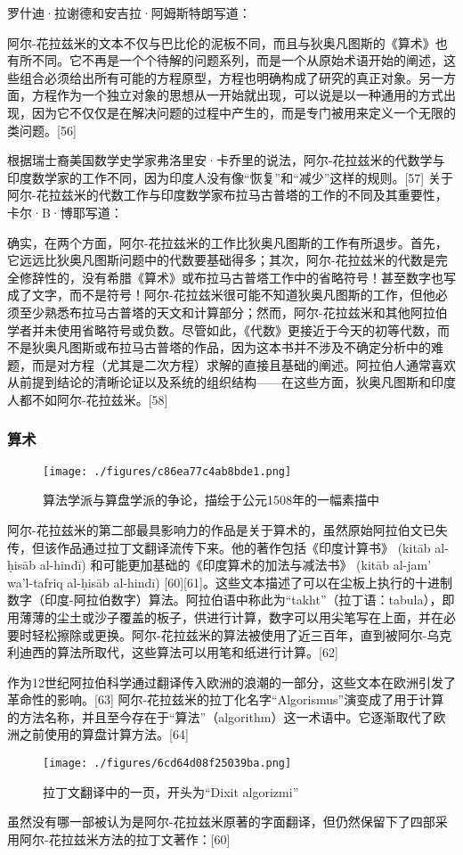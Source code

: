 罗什迪·拉谢德和安吉拉·阿姆斯特朗写道：

阿尔-花拉兹米的文本不仅与巴比伦的泥板不同，而且与狄奥凡图斯的《算术》也有所不同。它不再是一个个待解的问题系列，而是一个从原始术语开始的阐述，这些组合必须给出所有可能的方程原型，方程也明确构成了研究的真正对象。另一方面，方程作为一个独立对象的思想从一开始就出现，可以说是以一种通用的方式出现，因为它不仅仅是在解决问题的过程中产生的，而是专门被用来定义一个无限的类问题。[56]

根据瑞士裔美国数学史学家弗洛里安·卡乔里的说法，阿尔-花拉兹米的代数学与印度数学家的工作不同，因为印度人没有像“恢复”和“减少”这样的规则。[57] 关于阿尔-花拉兹米的代数工作与印度数学家布拉马古普塔的工作的不同及其重要性，卡尔·B·博耶写道：

确实，在两个方面，阿尔-花拉兹米的工作比狄奥凡图斯的工作有所退步。首先，它远远比狄奥凡图斯问题中的代数要基础得多；其次，阿尔-花拉兹米的代数是完全修辞性的，没有希腊《算术》或布拉马古普塔工作中的省略符号！甚至数字也写成了文字，而不是符号！阿尔-花拉兹米很可能不知道狄奥凡图斯的工作，但他必须至少熟悉布拉马古普塔的天文和计算部分；然而，阿尔-花拉兹米和其他阿拉伯学者并未使用省略符号或负数。尽管如此，《代数》更接近于今天的初等代数，而不是狄奥凡图斯或布拉马古普塔的作品，因为这本书并不涉及不确定分析中的难题，而是对方程（尤其是二次方程）求解的直接且基础的阐述。阿拉伯人通常喜欢从前提到结论的清晰论证以及系统的组织结构——在这些方面，狄奥凡图斯和印度人都不如阿尔-花拉兹米。[58]
\subsubsection{算术}
\begin{figure}[ht]
\centering
\texttt{[image: ./figures/c86ea77c4ab8bde1.png]}
\caption{算法学派与算盘学派的争论，描绘于公元1508年的一幅素描中} \label{fig_HLZM_4}
\end{figure}
阿尔-花拉兹米的第二部最具影响力的作品是关于算术的，虽然原始阿拉伯文已失传，但该作品通过拉丁文翻译流传下来。他的著作包括《印度计算书》 (kitāb al-ḥisāb al-hindī) 和可能更加基础的《印度算术的加法与减法书》 (kitāb al-jam' wa'l-tafriq al-ḥisāb al-hindī) [60][61]。这些文本描述了可以在尘板上执行的十进制数字（印度-阿拉伯数字）算法。阿拉伯语中称此为“takht”（拉丁语：tabula），即用薄薄的尘土或沙子覆盖的板子，供进行计算，数字可以用尖笔写在上面，并在必要时轻松擦除或更换。阿尔-花拉兹米的算法被使用了近三百年，直到被阿尔-乌克利迪西的算法所取代，这些算法可以用笔和纸进行计算。[62]

作为12世纪阿拉伯科学通过翻译传入欧洲的浪潮的一部分，这些文本在欧洲引发了革命性的影响。[63] 阿尔-花拉兹米的拉丁化名字“Algorismus”演变成了用于计算的方法名称，并且至今存在于“算法”（algorithm）这一术语中。它逐渐取代了欧洲之前使用的算盘计算方法。[64]
\begin{figure}[ht]
\centering
\texttt{[image: ./figures/6cd64d08f25039ba.png]}
\caption{拉丁文翻译中的一页，开头为“Dixit algorizmi”} \label{fig_HLZM_5}
\end{figure}
虽然没有哪一部被认为是阿尔-花拉兹米原著的字面翻译，但仍然保留下了四部采用阿尔-花拉兹米方法的拉丁文著作：[60]

